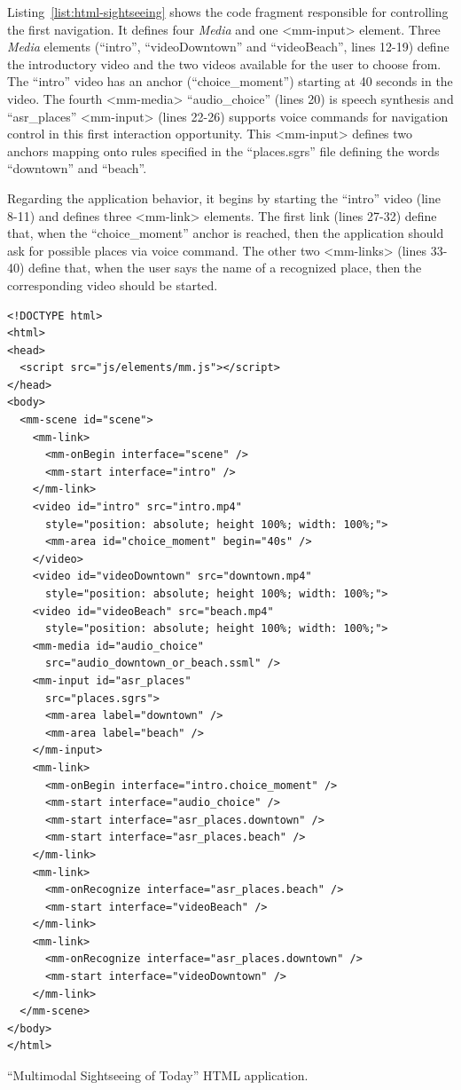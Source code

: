 \documentclass[
  doutorado,
  american
]{ThesisPUC}
\newcommand{\lis}[1]{Listing~\ref{#1}}
\begin{document}
\lis{list:html-sightseeing} shows the code fragment responsible for controlling
the first navigation. It defines four \textit{Media} and one <mm-input> 
element. Three \textit{Media} elements (“intro”, “videoDowntown” and 
“videoBeach”, lines 12-19) define the introductory video and the two videos 
available for the user to choose from.
The “intro” video has an anchor (“choice\_moment”) starting at 40 seconds in the
video. The fourth <mm-media> “audio\_choice” (lines 20) is speech synthesis and
“asr\_places” <mm-input> (lines 22-26) supports voice commands for navigation
control in this first interaction opportunity. This <mm-input> defines two
anchors mapping onto rules specified in the “places.sgrs” file defining the
words “downtown” and “beach”.

Regarding the application behavior, it begins by starting the “intro” video 
(line 8-11) and defines three <mm-link> elements. The first link (lines 27-32) 
define that, when the “choice\_moment” anchor is reached, then the application 
should ask for possible places via voice command. The other two <mm-links> 
(lines 33-40) define that, when the user says the name of a recognized place, 
then the corresponding video should be started.

\begin{verbatim}
<!DOCTYPE html>
<html>
<head>
  <script src="js/elements/mm.js"></script>
</head>
<body>
  <mm-scene id="scene">
    <mm-link>
      <mm-onBegin interface="scene" />
      <mm-start interface="intro" />
    </mm-link>
    <video id="intro" src="intro.mp4" 
      style="position: absolute; height 100%; width: 100%;">
      <mm-area id="choice_moment" begin="40s" />
    </video>
    <video id="videoDowntown" src="downtown.mp4" 
      style="position: absolute; height 100%; width: 100%;">
    <video id="videoBeach" src="beach.mp4" 
      style="position: absolute; height 100%; width: 100%;">
    <mm-media id="audio_choice"
      src="audio_downtown_or_beach.ssml" />
    <mm-input id="asr_places"
      src="places.sgrs">
      <mm-area label="downtown" />
      <mm-area label="beach" />
    </mm-input>
    <mm-link>
      <mm-onBegin interface="intro.choice_moment" />
      <mm-start interface="audio_choice" />
      <mm-start interface="asr_places.downtown" />
      <mm-start interface="asr_places.beach" />
    </mm-link>
    <mm-link>
      <mm-onRecognize interface="asr_places.beach" />
      <mm-start interface="videoBeach" />
    </mm-link>
    <mm-link>
      <mm-onRecognize interface="asr_places.downtown" />
      <mm-start interface="videoDowntown" />
    </mm-link>
  </mm-scene>
</body>
</html>
\end{verbatim}
\begin{listing}[!hb]
\caption{“Multimodal Sightseeing of Today” HTML application.}
\label{list:html-sightseeing}
\end{listing}
\end{document}
